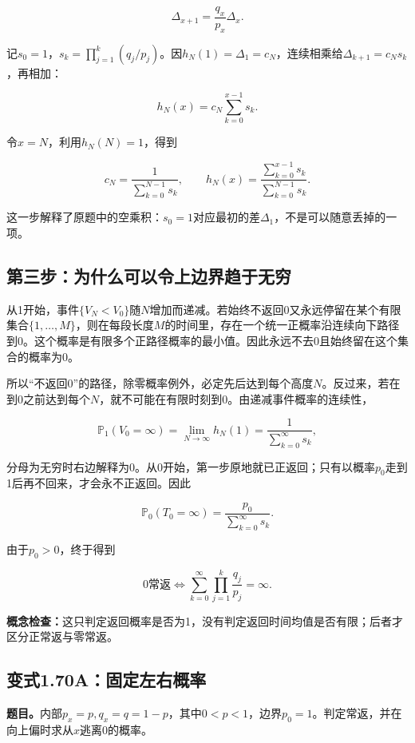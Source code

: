 \documentclass[
  11pt,a4paper,UTF8,fontset=fandol]{ctexart}
\begin{document}
\[\Delta_{x+1}=\frac{q_x}{p_x}\Delta_x.\]

记\(s_0=1\)，\(s_k=\prod_{j=1}^k(q_j/p_j)\)。因\(h_N(1)=\Delta_1=c_N\)，连续相乘给\(\Delta_{k+1}=c_Ns_k\)，再相加：

\[h_N(x)=c_N\sum_{k=0}^{x-1}s_k.\]

令\(x=N\)，利用\(h_N(N)=1\)，得到

\[\boxed{c_N=\frac1{\sum_{k=0}^{N-1}s_k},\qquad
h_N(x)=\frac{\sum_{k=0}^{x-1}s_k}{\sum_{k=0}^{N-1}s_k}.}\]

这一步解释了原题中的空乘积：\(s_0=1\)对应最初的差\(\Delta_1\)，不是可以随意丢掉的一项。

\subsection{第三步：为什么可以令上边界趋于无穷}\label{ux7b2cux4e09ux6b65ux4e3aux4ec0ux4e48ux53efux4ee5ux4ee4ux4e0aux8fb9ux754cux8d8bux4e8eux65e0ux7a77}

从1开始，事件\(\{V_N<V_0\}\)随\(N\)增加而递减。若始终不返回0又永远停留在某个有限集合\(\{1,\ldots,M\}\)，则在每段长度\(M\)的时间里，存在一个统一正概率沿连续向下路径到0。这个概率是有限多个正路径概率的最小值。因此永远不去0且始终留在这个集合的概率为0。

所以``不返回0''的路径，除零概率例外，必定先后达到每个高度\(N\)。反过来，若在到0之前达到每个\(N\)，就不可能在有限时刻到0。由递减事件概率的连续性，

\[\mathbb P_1(V_0=\infty)=\lim_{N\to\infty}h_N(1)
=\frac1{\sum_{k=0}^{\infty}s_k},\]

分母为无穷时右边解释为0。从0开始，第一步原地就已正返回；只有以概率\(p_0\)走到1后再不回来，才会永不正返回。因此

\[\mathbb P_0(T_0=\infty)=\frac{p_0}{\sum_{k=0}^{\infty}s_k}.\]

由于\(p_0>0\)，终于得到

\[\boxed{0\text{常返}\iff\sum_{k=0}^{\infty}\prod_{j=1}^k\frac{q_j}{p_j}=\infty.}\]

\textbf{概念检查：}这只判定返回概率是否为1，没有判定返回时间均值是否有限；后者才区分正常返与零常返。

\subsection{变式1.70A：固定左右概率}\label{ux53d8ux5f0f1.70aux56faux5b9aux5de6ux53f3ux6982ux7387}

\textbf{题目。}内部\(p_x=p,q_x=q=1-p\)，其中\(0<p<1\)，边界\(p_0=1\)。判定常返，并在向上偏时求从\(x\)逃离0的概率。
\end{document}
